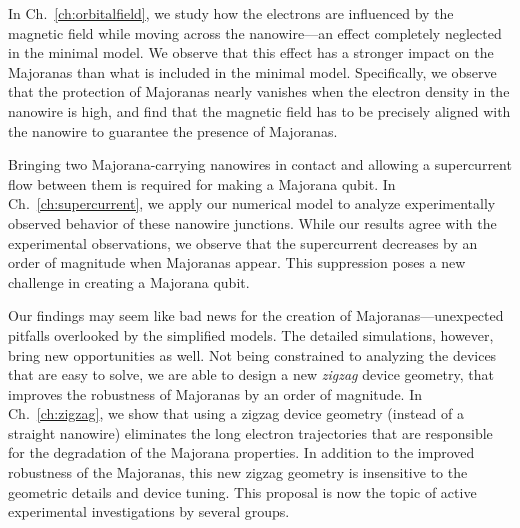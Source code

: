In Ch.~\ref{ch:orbitalfield}, we study how the electrons are influenced by the magnetic field while moving across the nanowire---an effect completely neglected in the minimal model.
We observe that this effect has a stronger impact on the Majoranas than what is included in the minimal model.
Specifically, we observe that the protection of Majoranas nearly vanishes when the electron density in the nanowire is high, and find that the magnetic field has to be precisely aligned with the nanowire to guarantee the presence of Majoranas.

Bringing two Majorana-carrying nanowires in contact and allowing a supercurrent flow between them is required for making a Majorana qubit.
In Ch.~\ref{ch:supercurrent}, we apply our numerical model to analyze experimentally observed behavior of these nanowire junctions.
While our results agree with the experimental observations, we observe that the supercurrent decreases by an order of magnitude when Majoranas appear.
This suppression poses a new challenge in creating a Majorana qubit.

Our findings may seem like bad news for the creation of Majoranas---unexpected pitfalls overlooked by the simplified models.
The detailed simulations, however, bring new opportunities as well.
Not being constrained to analyzing the devices that are easy to solve, we are able to design a new \emph{zigzag} device geometry, that improves the robustness of Majoranas by an order of magnitude.
In Ch.~\ref{ch:zigzag}, we show that using a zigzag device geometry (instead of a straight nanowire) eliminates the long electron trajectories that are responsible for the degradation of the Majorana properties.
In addition to the improved robustness of the Majoranas, this new zigzag geometry is insensitive to the geometric details and device tuning.
This proposal is now the topic of active experimental investigations by several groups.

